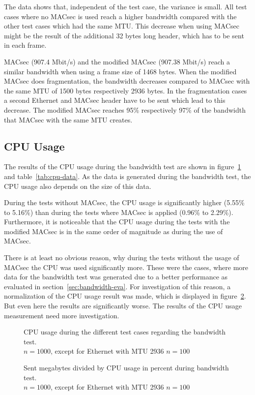 The data shows that, independent of the test case, the variance is small.
All test cases where no \gls{MACsec} is used reach a higher bandwidth compared with the other test cases which had the same \gls{MTU}.
This decrease when using \gls{MACsec} might be the result of the additional 32 bytes long header, which has to be sent in each frame.

\gls{MACsec} (907.4 Mbit/s) and the modified \gls{MACsec} (907.38 Mbit/s) reach a similar bandwidth when using a frame size of 1468 bytes.
When the modified \gls{MACsec} does fragmentation, the bandwidth decreases compared to \gls{MACsec} with the same \gls{MTU} of 1500 bytes respectively 2936 bytes.
In the fragmentation cases a second Ethernet and \gls{MACsec} header have to be sent which lead to this decrease.
The modified \gls{MACsec} reaches 95\% respectively 97\% of the bandwidth that \gls{MACsec} with the same \gls{MTU} creates.

\subsection{CPU Usage}
The results of the CPU usage during the bandwidth test are shown in figure~\ref{fig:cpu-test} and table~\ref{tab:cpu-data}.
As the data is generated during the bandwidth test, the CPU usage also depends on the size of this data.

During the tests without \gls{MACsec}, the CPU usage is significantly higher (5.55\% to 5.16\%) than during the tests where \gls{MACsec} is applied (0.96\% to 2.29\%).
Furthermore, it is noticeable that the CPU usage during the tests with the modified \gls{MACsec} is in the same order of magnitude as during the use of \gls{MACsec}.

There is at least no obvious reason, why during the tests without the usage of \gls{MACsec} the CPU was used significantly more.
These were the cases, where more data for the bandwidth test was generated due to a better performance as evaluated in section~\ref{sec:bandwidth-eva}.
For investigation of this reason, a normalization of the CPU usage result was made, which is displayed in figure~\ref{fig:cpu-test-norm}.
But even here the results are significantly worse.
The results of the CPU usage measurement need more investigation.

\begin{figure}
    \centering
    \def\svgwidth{\columnwidth}
    
    \caption[CPU Usage experiment]{CPU usage during the different test cases regarding the bandwidth test.\\$n=1000$, except for Ethernet with MTU 2936 $n=100$}
    \label{fig:cpu-test}
\end{figure}
\begin{figure}
    \centering
    \def\svgwidth{\columnwidth}
    
    \caption[CPU Usage normalized to sent megabytes]{Sent megabytes divided by CPU usage in percent during bandwidth test.\\$n=1000$, except for Ethernet with MTU 2936 $n=100$}
    \label{fig:cpu-test-norm}
\end{figure}


